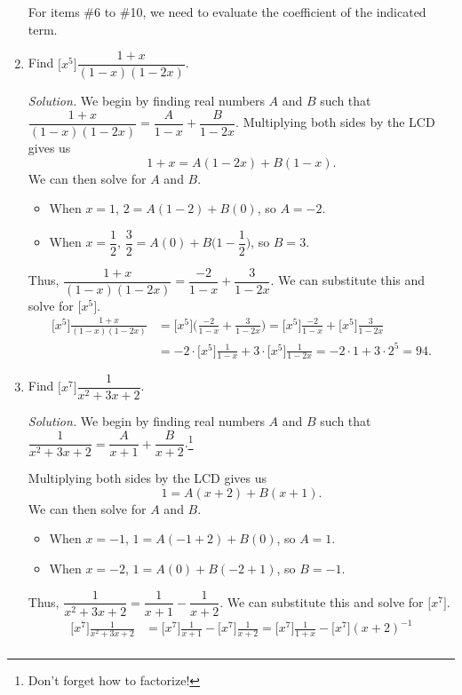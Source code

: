 \documentclass{article}
\begin{document}
\begin{enumerate}
{\begin{minipage}[c]{0.9\textwidth}
        \centering
        For items \#6 to \#10, we need to evaluate the coefficient of the indicated term. 
    \end{minipage}
    }
    \item Find $\big[x^5\big] \dfrac{1+x}{(1-x)(1-2x)}$.\par
        \parindent=0.25pt \textit{Solution.} We begin by finding real numbers $A$ and $B$ such that $\dfrac{1+x}{(1-x)(1-2x)} = \dfrac{A}{1-x} + \dfrac{B}{1-2x}$. Multiplying both sides by the LCD gives us\[
            1+x = A(1-2x) + B(1-x).
        \] We can then solve for $A$ and $B$.\begin{itemize} 
            \item When $x=1$, $2= A(1-2) + B(0)$, so $ A=-2$. 
            \item When $x=\dfrac{1}{2}$, $\dfrac{3}{2}= A(0) + B\bigg(1-\dfrac{1}{2}\bigg)$, so $ B=3$. 
        \end{itemize} Thus, $\dfrac{1+x}{(1-x)(1-2x)} = \dfrac{-2}{1-x} + \dfrac{3}{1-2x}$. We can substitute this and solve for $\big[x^5\big]$.\begin{align*} 
            \big[x^5\big] \frac{1+x}{(1-x)(1-2x)} &= \big[x^5\big] \bigg( \frac{-2}{1-x} + \frac{3}{1-2x} \bigg) = \big[x^5\big] \frac{-2}{1-x} + \big[x^5\big] \frac{3}{1-2x}\\ 
            &= -2\cdot \big[x^5\big] \frac{1}{1-x} + 3\cdot \big[x^5\big] \frac{1}{1-2x} = -2 \cdot 1 + 3\cdot 2^5 = 94. \tag*{$\blacksquare$}
        \end{align*} 
    \item Find $\big[x^7\big] \dfrac{1}{x^2 + 3x + 2}$.\par 
    \textit{Solution.} We begin by finding real numbers $A$ and $B$ such that $\dfrac{1}{x^2+3x+2} = \dfrac{A}{x+1} + \dfrac{B}{x+2}$.\footnote{Don't forget how to factorize!}\par 
    Multiplying both sides by the LCD gives us\[
        1 = A(x+2) + B(x+1).    
    \] We can then solve for $A$ and $B$.\begin{itemize} 
        \item When $x=-1$, $1 = A(-1+2) + B(0)$, so $A=1$. 
        \item When $x=-2$, $1 = A(0) + B(-2+1)$, so $B=-1$. 
    \end{itemize} Thus, $\dfrac{1}{x^2 + 3x + 2} = \dfrac{1}{x+1} - \dfrac{1}{x+2}$. We can substitute this and solve for $\big[x^7\big]$.\begin{align*} 
        \big[x^7\big] \frac{1}{x^2 + 3x + 2} &= \big[x^7\big] \frac{1}{x+1} - \big[x^7\big] \frac{1}{x+2} = \big[x^7\big] \frac{1}{1+x} - \big[x^7\big] {(x+2)}^{-1} \\ 

\end{align*}
\end{enumerate}
\end{document}
